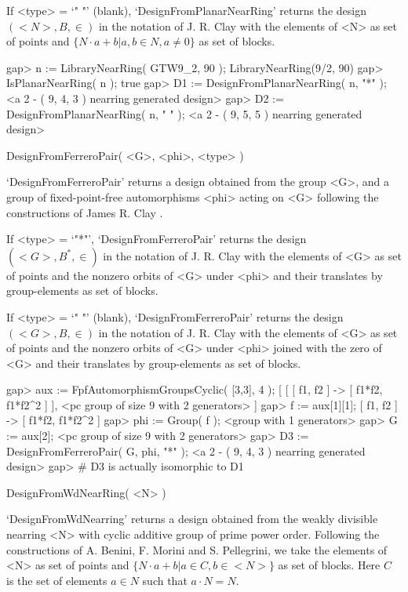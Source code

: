 If <type> = `" "' (blank), `DesignFromPlanarNearRing' returns the design 
$(<N>,B,\in)$ in the notation of J. R. Clay with the elements of <N> as 
set of points and $\{N\cdot a+b | a,b\in N, a \not= 0 \}$ as set of 
blocks.

\beginexample
    gap> n := LibraryNearRing( GTW9_2, 90 );
    LibraryNearRing(9/2, 90)
    gap> IsPlanarNearRing( n );
    true
    gap> D1 := DesignFromPlanarNearRing( n, "*" );
    <a 2 - ( 9, 4, 3 ) nearring generated design>
    gap> D2 := DesignFromPlanarNearRing( n, " " );
    <a 2 - ( 9, 5, 5 ) nearring generated design>
\endexample

\>DesignFromFerreroPair( <G>, <phi>, <type> )

`DesignFromFerreroPair' returns a design obtained from the group <G>, and
a group of fixed-point-free automorphisms <phi> acting on <G> following the
constructions of James R. Clay \cite{Clay:Nearrings}.

If <type> = `"*"', `DesignFromFerreroPair' returns the design 
$(<G>,B^{*},\in)$ in the notation of J. R. Clay with the elements of <G> as 
set of points and the nonzero orbits of <G> under <phi> and their 
translates by group-elements as set of blocks.

If <type> = `" "' (blank), `DesignFromFerreroPair' returns the design 
$(<G>,B,\in)$ in the notation of J. R. Clay with the elements of <G> as 
set of points and the nonzero orbits of <G> under <phi> joined with the zero
of <G> and their translates by group-elements as set of blocks.

\beginexample
    gap> aux := FpfAutomorphismGroupsCyclic( [3,3], 4 );
    [ [ [ f1, f2 ] -> [ f1*f2, f1*f2^2 ] ], 
      <pc group of size 9 with 2 generators> ]
    gap> f := aux[1][1];
    [ f1, f2 ] -> [ f1*f2, f1*f2^2 ]
    gap> phi := Group( f );
    <group with 1 generators>
    gap> G := aux[2]; 
    <pc group of size 9 with 2 generators>
    gap> D3 := DesignFromFerreroPair( G, phi, "*" );
    <a 2 - ( 9, 4, 3 ) nearring generated design>
    gap> # D3 is actually isomorphic to D1
\endexample

\>DesignFromWdNearRing( <N> )

`DesignFromWdNearring' returns a design obtained from the weakly divisible 
nearring <N> with cyclic additive group of prime power order. Following the
constructions of A. Benini, F. Morini and S. Pellegrini, we take the elements
of <N> as set of points and $\{N\cdot a+b | a\in C, b\in <N>\}$ as set of
blocks. Here $C$ is the set of elements $a\in N$ such that $a\cdot N = N$.


